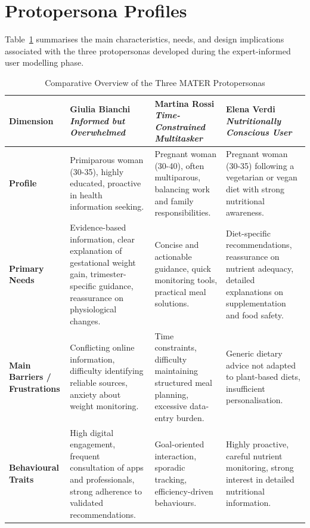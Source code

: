 \documentclass[11pt]{article}
\begin{document}
\section{Protopersona Profiles}
\label{app:protopersona-profiles}

Table~\ref{tab:protopersona_comparison} summarises the main characteristics, needs, and design implications associated with the three protopersonas developed during the expert-informed user modelling phase.

\begin{table}[ht]
\centering
\caption{Comparative Overview of the Three MATER Protopersonas}
\label{tab:protopersona_comparison}
\begin{tabular}{p{3cm}p{3.8cm}p{3.8cm}p{3.8cm}}
\hline
\textbf{Dimension} & 
\textbf{Giulia Bianchi} \newline \emph{Informed but Overwhelmed} &
\textbf{Martina Rossi} \newline \emph{Time-Constrained Multitasker} &
\textbf{Elena Verdi} \newline \emph{Nutritionally Conscious User} \\
\hline

\textbf{Profile} &
Primiparous woman (30-35), highly educated, proactive in health information seeking. &
Pregnant woman (30-40), often multiparous, balancing work and family responsibilities. &
Pregnant woman (30-35) following a vegetarian or vegan diet with strong nutritional awareness. \\

\textbf{Primary Needs} &
Evidence-based information, clear explanation of gestational weight gain, trimester-specific guidance, reassurance on physiological changes. &
Concise and actionable guidance, quick monitoring tools, practical meal solutions. &
Diet-specific recommendations, reassurance on nutrient adequacy, detailed explanations on supplementation and food safety. \\

\textbf{Main Barriers / Frustrations} &
Conflicting online information, difficulty identifying reliable sources, anxiety about weight monitoring. &
Time constraints, difficulty maintaining structured meal planning, excessive data-entry burden. &
Generic dietary advice not adapted to plant-based diets, insufficient personalisation. \\

\textbf{Behavioural Traits} &
High digital engagement, frequent consultation of apps and professionals, strong adherence to validated recommendations. &
Goal-oriented interaction, sporadic tracking, efficiency-driven behaviours. &
Highly proactive, careful nutrient monitoring, strong interest in detailed nutritional information. \\


\end{tabular}
\end{table}
\end{document}
